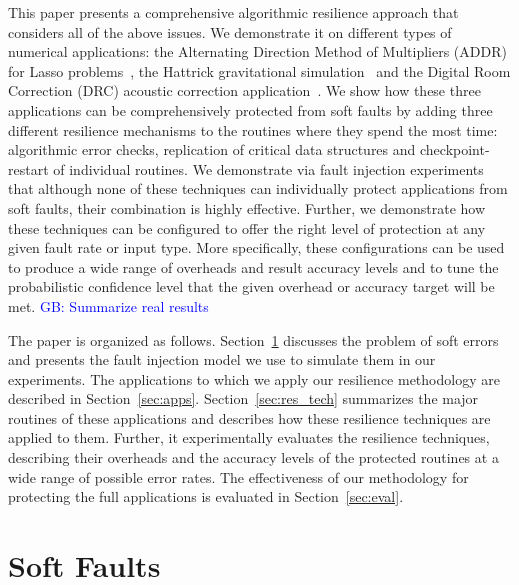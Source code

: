 \documentclass{sig-alternate}
\newcommand{\greg}[1]{%
  \textcolor{blue}{GB: #1}
}
\begin{document}
This paper presents a comprehensive algorithmic resilience approach that considers all of the above issues.
We demonstrate it on different types of numerical applications: the Alternating Direction Method of Multipliers (ADDR) for Lasso problems~\cite{lasso:2011}, the Hattrick gravitational simulation~\cite{hattrick:2012} and the Digital Room Correction (DRC) acoustic correction application~\cite{drc:2012}.
We show how these three applications can be comprehensively protected from soft faults by adding three different resilience mechanisms to the routines where they spend the most time: algorithmic error checks, replication of critical data structures and checkpoint-restart of individual routines.
We demonstrate via fault injection experiments that although none of these techniques can individually protect applications from soft faults, their combination is highly effective.
Further, we demonstrate how these techniques can be configured to offer the right level of protection at any given fault rate or input type.
More specifically, these configurations can be used to produce a wide range of overheads and result accuracy levels and to tune the probabilistic confidence level that the given overhead or accuracy target will be met.
\greg{Summarize real results}

The paper is organized as follows.
Section~\ref{sec:soft_faults} discusses the problem of soft errors and presents the fault injection model we use to simulate them in our experiments.
The applications to which we apply our resilience methodology are described in Section~\ref{sec:apps}.
Section~\ref{sec:res_tech} summarizes the major routines of these applications and describes how these resilience techniques are applied to them.
Further, it experimentally evaluates the resilience techniques, describing their overheads and the accuracy levels of the protected routines at a wide range of possible error rates.
The effectiveness of our methodology for protecting the full applications is evaluated in Section~\ref{sec:eval}.

\section{Soft Faults}
\label{sec:soft_faults}
\end{document}
